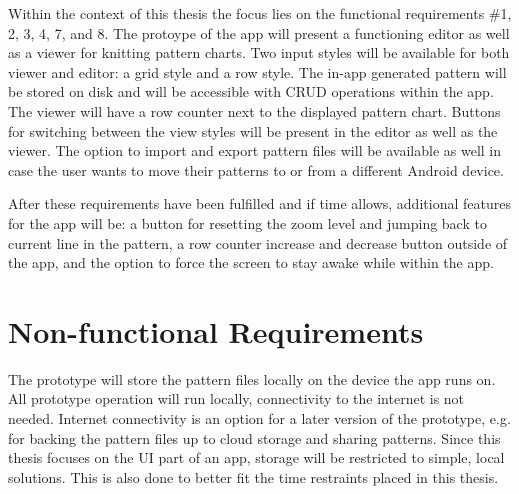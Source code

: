 Within the context of this thesis the focus lies on the functional requirements \#1, 2, 3, 4, 7, and 8. The protoype of the app will present a functioning editor as well as a viewer for knitting pattern charts. Two input styles will be available for both viewer and editor: a grid style and a row style. The in-app generated pattern will be stored on disk and will be accessible with CRUD operations within the app. The viewer will have a row counter next to the displayed pattern chart. Buttons for switching between the view styles will be present in the editor as well as the viewer. The option to import and export pattern files will be available as well in case the user wants to move their patterns to or from a different Android device. 

After these requirements have been fulfilled and if time allows, additional features for the app will be: a button for resetting the zoom level and jumping back to current line in the pattern, a row counter increase and decrease button outside of the app, and the option to force the screen to stay awake while within the app.

\section{Non-functional Requirements}

The prototype will store the pattern files locally on the device the app runs on. All prototype operation will run locally, connectivity to the internet is not needed. Internet connectivity is an option for a later version of the prototype, e.g. for backing the pattern files up to cloud storage and sharing patterns. Since this thesis focuses on the \gls{UI} part of an app, storage will be restricted to simple, local solutions. This is also done to better fit the time restraints placed in this thesis.